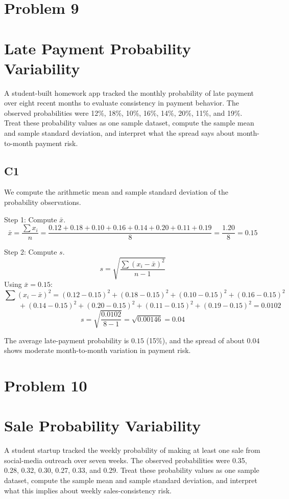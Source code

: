 \begin{ExamProblems}
		\section{Problem 9}
		\section{Late Payment Probability Variability}
		A student-built homework app tracked the monthly probability of late payment over eight recent months to evaluate consistency in payment behavior. The observed probabilities were 12\%, 18\%, 10\%, 16\%, 14\%, 20\%, 11\%, and 19\%. Treat these probability values as one sample dataset, compute the sample mean and sample standard deviation, and interpret what the spread says about month-to-month payment risk.

		\subsection*{C1}
		We compute the arithmetic mean and sample standard deviation of the probability observations.

		Step 1: Compute $\bar{x}$.
		\[
		\bar{x} = \frac{\sum x_i}{n}
		= \frac{0.12+0.18+0.10+0.16+0.14+0.20+0.11+0.19}{8}
		= \frac{1.20}{8}
		= 0.15
		\]

		Step 2: Compute $s$.
		\[
		s = \sqrt{\frac{\sum (x_i-\bar{x})^2}{n-1}}
		\]
		Using $\bar{x}=0.15$:
		\[
		\sum (x_i-\bar{x})^2 = (0.12-0.15)^2+(0.18-0.15)^2+(0.10-0.15)^2+(0.16-0.15)^2
		\]
		\[
		\qquad +(0.14-0.15)^2+(0.20-0.15)^2+(0.11-0.15)^2+(0.19-0.15)^2 = 0.0102
		\]
		\[
		s = \sqrt{\frac{0.0102}{8-1}} = \sqrt{0.00146} = 0.04
		\]

		The average late-payment probability is $0.15$ (15\%), and the spread of about $0.04$ shows moderate month-to-month variation in payment risk.

		\newpage
		\item
		\section{Problem 10}
		\section{Sale Probability Variability}
		A student startup tracked the weekly probability of making at least one sale from social-media outreach over seven weeks. The observed probabilities were 0.35, 0.28, 0.32, 0.30, 0.27, 0.33, and 0.29. Treat these probability values as one sample dataset, compute the sample mean and sample standard deviation, and interpret what this implies about weekly sales-consistency risk.


\end{ExamProblems}
